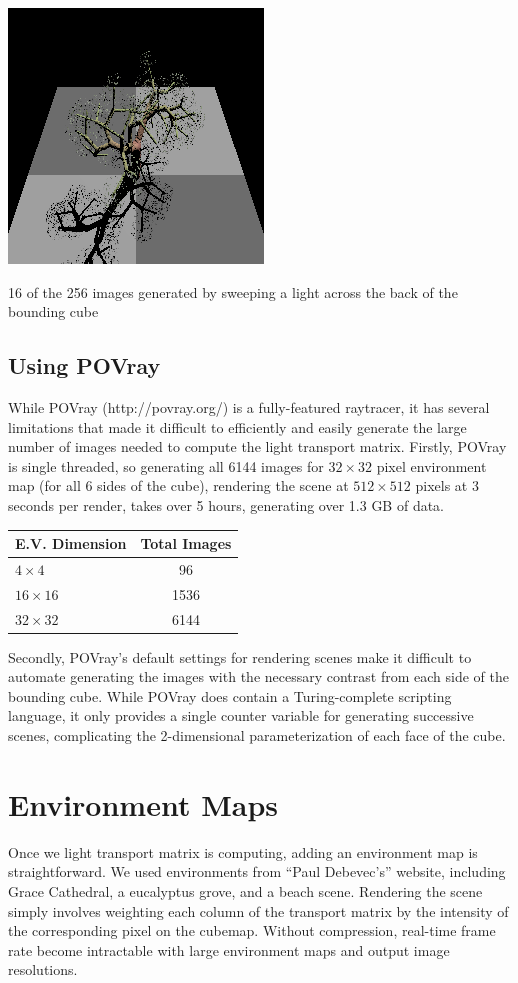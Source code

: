 \documentclass[11pt]{article}
\begin{document}
\begin{table}[htb]
    \includegraphics[width=.2\linewidth]{figs/tree/0015}
    \caption{16 of the 256 images generated by sweeping a light across the back of the bounding cube}
\end{table}

\subsection{Using POVray}

While POVray (http://povray.org/) is a fully-featured raytracer, it has several
limitations that made it difficult to efficiently and easily generate the large
number of images needed to compute the light transport matrix. Firstly, POVray
is single threaded, so generating all 6144 images for $32\times 32$ pixel
environment map (for all 6 sides of the cube), rendering the scene at
$512\times 512$ pixels at 3 seconds per render, takes over 5 hours, generating
over 1.3 GB of data.

\begin{center}
\begin{tabular}{|l|c|}
 \hline
 E.V. Dimension & Total Images\\
 \hline
 $4\times 4$ & 96 \\
 $16\times 16$ & 1536 \\
 $32\times 32$ & 6144 \\
 \hline
\end{tabular}
\end{center}

Secondly, POVray's default settings for rendering scenes make it difficult to
automate generating the images with the necessary contrast from each side of
the bounding cube. While POVray does contain a Turing-complete scripting
language, it only provides a single counter variable for generating successive
scenes, complicating the 2-dimensional parameterization of each face of the
cube.

\section{Environment Maps}

Once we light transport matrix is computing, adding an environment map is
straightforward. We used environments from ``Paul Debevec's'' website,
including Grace Cathedral, a eucalyptus grove, and a beach scene. Rendering the
scene simply involves weighting each column of the transport matrix by the
intensity of the corresponding pixel on the cubemap. Without compression,
real-time frame rate become intractable with large environment maps and output
image resolutions.
\end{document}
